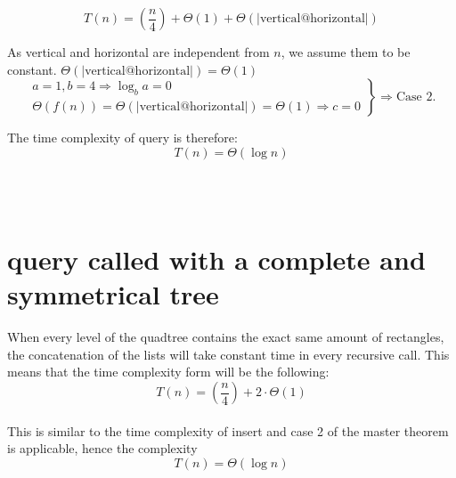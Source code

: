 \documentclass[12pt, a4paper]{article}
\begin{document}
$$T(n)=\left(\frac{n}{4}\right)+\Theta(1)+\Theta(|\text{vertical@horizontal}|)$$

As vertical and horizontal are independent from $n$, we assume them to be constant. $\Theta(|\text{vertical@horizontal}|) = \Theta(1)$\\

\[
\left.
\begin{array}{l}
  a=1, b=4 \Rightarrow \log_ba = 0 \\
  \Theta(f(n)) = \Theta(|\text{vertical@horizontal}|) = \Theta(1) \Rightarrow c = 0
\end{array} \right\} \Rightarrow \text{Case 2.}
\]

The time complexity of query is therefore: $$T(n)=\Theta(\log n)$$

\\
\\
\section{query called with a complete and symmetrical tree}

When every level of the quadtree contains the exact same amount of rectangles, the concatenation of the lists will take constant time in every recursive call. This means that the time complexity form will be the following: $$T(n)=\left(\frac{n}{4}\right)+2\cdot\Theta(1)$$\\

This is similar to the time complexity of insert and case 2 of the master theorem is applicable, hence the complexity $$T(n)=\Theta(\log n)$$
\end{document}
